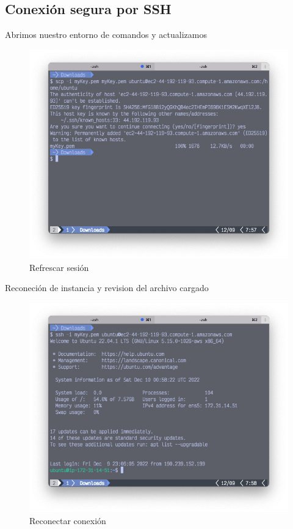\subsection{Conexión segura por SSH}
Abrimos nuestro entorno de comandos y actualizamos
 \clearpage
\begin{figure}[h]
	\centering
	\includegraphics[scale=.35] {img/27-scp-i}
	\caption{Refrescar sesión}
	\label{fig:27}	
\end{figure}
Reconeción de instancia y revision del archivo cargado
\begin{figure}[h]
	\centering
	\includegraphics[scale=.35] {img/28-reconect}
	\caption{Reconectar conexión}
	\label{fig:28}	
\end{figure}
